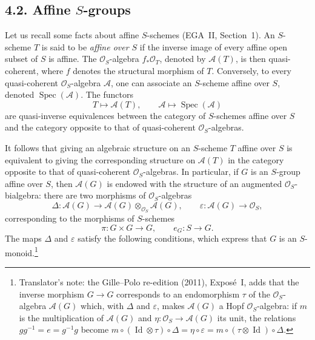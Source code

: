 \subsection*{4.2. Affine \(S\)-groups}

Let us recall some facts about affine \(S\)-schemes (EGA~II, Section~1).
An \(S\)-scheme \(T\) is said to be \emph{affine over \(S\)} if the
inverse image of every affine open subset of \(S\) is affine. The
\(\mathcal O_S\)-algebra \(f_*\mathcal O_T\), denoted by
\(\mathscr A(T)\), is then quasi-coherent, where \(f\) denotes the
structural morphism of \(T\). Conversely, to every quasi-coherent
\(\mathcal O_S\)-algebra \(\mathscr A\), one can associate an
\(S\)-scheme affine over \(S\), denoted \(\operatorname{Spec}(\mathscr A)\).
The functors
\[
  T\longmapsto\mathscr A(T),
  \qquad
  \mathscr A\longmapsto\operatorname{Spec}(\mathscr A)
\]
are quasi-inverse equivalences between the category of \(S\)-schemes
affine over \(S\) and the category opposite to that of quasi-coherent
\(\mathcal O_S\)-algebras.

It follows that giving an algebraic structure on an \(S\)-scheme \(T\)
affine over \(S\) is equivalent to giving the corresponding structure on
\(\mathscr A(T)\) in the category opposite to that of quasi-coherent
\(\mathcal O_S\)-algebras. In particular, if \(G\) is an \(S\)-group
affine over \(S\), then \(\mathscr A(G)\) is endowed with the structure of
an augmented \(\mathcal O_S\)-bialgebra: there are two morphisms of
\(\mathcal O_S\)-algebras
\[
  \Delta:\mathscr A(G)\longrightarrow
    \mathscr A(G)\otimes_{\mathcal O_S}\mathscr A(G),
  \qquad
  \varepsilon:\mathscr A(G)\longrightarrow\mathcal O_S,
\]
corresponding to the morphisms of \(S\)-schemes
\[
  \pi:G\times G\longrightarrow G,
  \qquad
  e_G:S\longrightarrow G.
\]
The maps \(\Delta\) and \(\varepsilon\) satisfy the following conditions,
which express that \(G\) is an \(S\)-monoid.\footnote{Translator's note: the Gille--Polo re-edition (2011), Exposé~I, adds that the
inverse morphism \(G\to G\) corresponds to an endomorphism \(\tau\) of the
\(\mathcal O_S\)-algebra \(\mathscr A(G)\) which, with \(\Delta\) and
\(\varepsilon\), makes \(\mathscr A(G)\) a Hopf \(\mathcal O_S\)-algebra: if
\(m\) is the multiplication of \(\mathscr A(G)\) and
\(\eta:\mathcal O_S\to\mathscr A(G)\) its unit, the relations
\(gg^{-1}=e=g^{-1}g\) become
\(m\circ(\operatorname{Id}\otimes\tau)\circ\Delta=\eta\circ\varepsilon
=m\circ(\tau\otimes\operatorname{Id})\circ\Delta\).}


